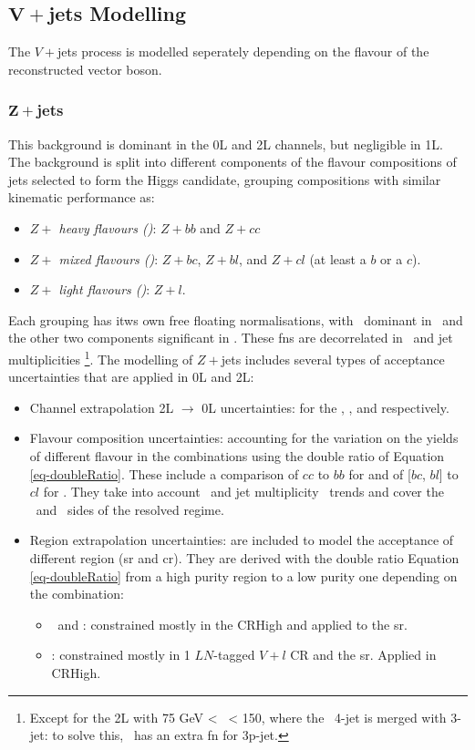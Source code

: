 \subsection[$V+$jets Modelling]{$\boldsymbol{V+}$jets Modelling}\label{sec-modVjet} %
The $V+$jets process is modelled seperately depending on the flavour of the reconstructed vector boson. 

\subsubsection{$\boldsymbol{Z+}$jets}
This background is dominant in the 0L and 2L channels, but negligible in 1L. The background is split into different components of the flavour compositions of jets selected to form the Higgs candidate, grouping compositions with similar kinematic performance as:   
\begin{itemize}
    \item \textit{$Z+$ heavy flavours (\zhf)}: $Z+bb$ and $Z+cc$
    \item \textit{$Z+$ mixed flavours (\zmf)}: $Z+bc$, $Z+bl$, and $Z+cl$ (at least a $b$ or a $c$).
    \item \textit{$Z+$ light flavours (\zlf)}: $Z+l$.
\end{itemize}
Each grouping has itws own free floating normalisations, with \zhf\ dominant in \vhb\ and the other two components significant in \vhc. These \gls{fn}s are decorrelated in \ptv\ and jet multiplicities \nj\footnote{Except for the 2L with 75 GeV < \ptv\ < 150, where the \vhb\ 4-jet is merged with 3-jet: to solve this, \vhb\ has an extra \zhf \gls{fn} for 3p-jet.}. The modelling of $Z+$jets includes several types of acceptance uncertainties that are applied in 0L and 2L:
\begin{itemize}[leftmargin=*]
    \item Channel extrapolation 2L $\rightarrow$ 0L uncertainties: for the \zhf, \zmf, and \zlf respectively. 
    \item Flavour composition uncertainties: accounting for the variation on the yields of different flavour in the combinations using the double ratio of Equation \ref{eq-doubleRatio}. These include a comparison of $cc$ to $bb$ for \zhf and of [$bc$, $bl$] to $cl$ for \zmf. They take into account \ptv\ and jet multiplicity \nj\ trends and cover the \vhb\ and \vhc\ sides of the resolved regime. 
    \item Region extrapolation uncertainties: are included to model the acceptance of different region (\gls{sr} and \gls{cr}). They are derived with the double ratio Equation \ref{eq-doubleRatio} from a high purity region to a low purity one depending on the combination:
    \begin{itemize}
        \item \zhf\ and \zmf: constrained mostly in the CRHigh and applied to the \gls{sr}. 
        \item \zlf: constrained mostly in 1 $LN$-tagged $V+l$ CR and the \gls{sr}. Applied in CRHigh. %
    \end{itemize}
\end{itemize}
